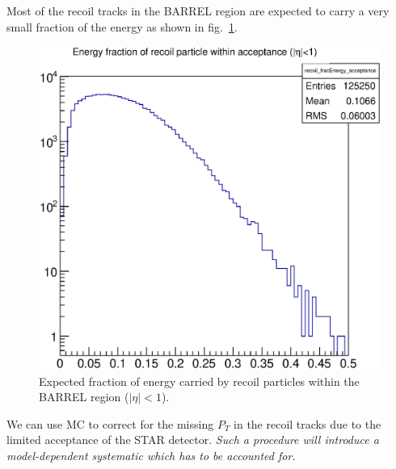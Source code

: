 \documentclass[12pt]{article}
\begin{document}
Most of the recoil tracks in the BARREL region are expected to carry a very
small fraction of the energy as shown in fig.~\ref{fig:MC_recoil_Efrac}.

\begin{figure}[htbp]
\centering
\includegraphics[height=0.25\textheight]{images/recoil_energy_frac.eps}
\caption{Expected fraction of energy carried by recoil particles within the BARREL region ($|\eta|<1$).}
\label{fig:MC_recoil_Efrac} 
\end{figure}

We can use MC to correct for the missing $P_{T}$ in the recoil tracks due to
the limited acceptance of the STAR detector. \textit{Such a procedure will
introduce a model-dependent systematic which has to be accounted for.} 


\end{document}
